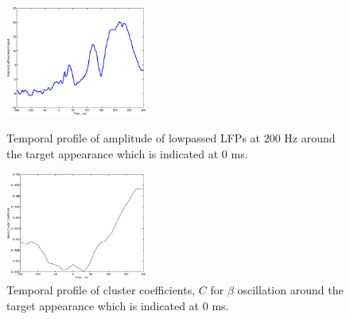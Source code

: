 \documentclass[letterpaper, 9pt, conference]{ieeeconf}
\begin{document}
\begin{figure}[ht!]
\begin{minipage}{10pc}
\includegraphics[width=11pc]{MeanLowpassedAmp.eps}
\caption{\label{label}Temporal profile of amplitude of lowpassed LFPs at $200$ Hz around the target appearance which is indicated at $0$ ms.}
\end{minipage}\hspace{2pc}
\begin{minipage}{10pc}
\includegraphics[width=11pc]{GrandMeanCC.eps}
\caption{\label{label}Temporal profile of cluster coefficients, $C$ for $\beta$ oscillation around the target appearance which is indicated at $0$ ms.}
\end{minipage} \hspace{2pc}

\end{figure}
\end{document}
